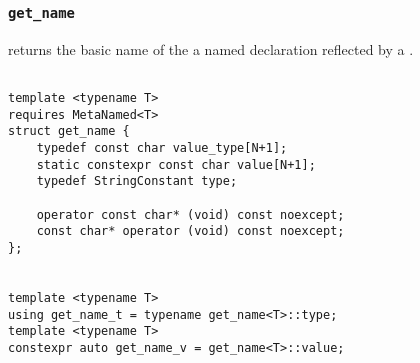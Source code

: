 
\subsubsection{\texttt{get\_name}}

returns the basic name of the a named declaration reflected by a .

\begin{verbatim}

template <typename T>
requires MetaNamed<T>
struct get_name {
	typedef const char value_type[N+1];
	static constexpr const char value[N+1];
	typedef StringConstant type;

	operator const char* (void) const noexcept;
	const char* operator (void) const noexcept;
};


template <typename T>
using get_name_t = typename get_name<T>::type;
template <typename T>
constexpr auto get_name_v = get_name<T>::value;

\end{verbatim}
